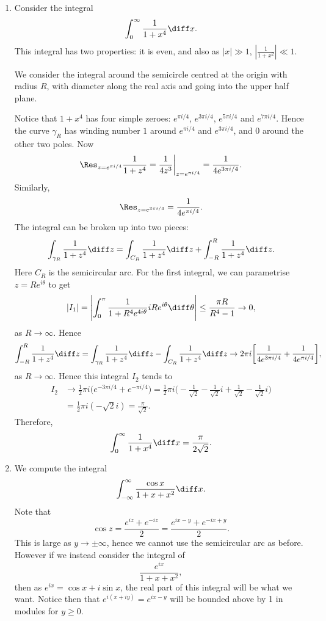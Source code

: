 \documentclass[12pt]{article}
\begin{document}
\begin{exbox}
	\begin{enumerate}
		\item Consider the integral
			\[
			\int_0^\infty \frac{1}{1+x^{4}}\diff x.
			\]
			This integral has two properties: it is even, and also as $|x| \gg 1$, $| \frac{1}{1 + x^2}| \ll 1$.

			We consider the integral around the semicircle centred at the origin with radius $R$, with diameter along the real axis and going into the upper half plane.%

			Notice that $1 + x^{4}$ has four simple zeroes: $e^{\pi i/4}$, $e^{3 \pi i/4}$, $e^{5 \pi i/4}$ and $e^{7 \pi i/4}$. Hence the curve $\gamma_R$ has winding number $1$ around $e^{\pi i/4}$ and $e^{3 \pi i/4}$, and $0$ around the other two poles. Now
			\[
				\Res_{z = e^{\pi i/4}} \frac{1}{1 + z^{4}} = \frac{1}{4 z^3} \biggr|_{z = e^{\pi i/4}} = \frac{1}{4 e^{3 \pi i/4}}.
			\]
			Similarly,
			\[
				\Res_{z = e^{3 \pi i/4}} = \frac{1}{4 e^{\pi i/4}}.
			\]
			The integral can be broken up into two pieces:
			\[
				\int_{\gamma_R} \frac{1}{1 + z^{4}}\diff z = \int_{C_R} \frac{1}{1 + z^{4}}\diff z + \int_{-R}^{R} \frac{1}{1 + z^{4}}\diff z.
			\]
			Here $C_R$ is the semicircular arc. For the first integral, we can parametrise $z = Re^{i \theta}$ to get
			\[
			|I_1| = \Biggl| \int_0^\pi \frac{1}{1 + R^{4} e^{4 i \theta}} i R e^{i \theta} \diff \theta \Biggr| \le \frac{\pi R}{R^{4} - 1} \to 0,
			\]
			as $R \to \infty$. Hence
			\[
				\int_{-R}^{R} \frac{1}{1 + z^{4}} \diff z = \int_{\gamma_R} \frac{1}{1 + z^{4}}\diff z - \int_{C_R} \frac{1}{1 + z^{4}} \diff z \to 2 \pi i \biggl[ \frac{1}{4 e^{3 \pi i/4}} + \frac{1}{4 e^{\pi i/4}}\biggr],
			\]
			as $R \to \infty$. Hence this integral $I_2$ tends to
			\begin{align*}
				I_2 &\to \frac{1}{2} \pi i \bigl(e^{-3 \pi i/4} + e^{-\pi i/4}\bigr) = \frac{1}{2} \pi i \biggl( - \frac{1}{\sqrt 2} - \frac{1}{\sqrt 2} i + \frac{1}{\sqrt 2} - \frac{1}{\sqrt 2} i \biggr) \\
				    &= \frac{1}{2} \pi i (-\sqrt 2 i) = \frac{\pi}{\sqrt 2}.
			\end{align*}
			Therefore,
			\[
			\int_0^\infty \frac{1}{1 + x^{4}}\diff x = \frac{\pi}{2 \sqrt 2}.
			\]
		\item We compute the integral
			\[
				\int_{-\infty}^{\infty} \frac{\cos x}{1 + x + x^2}\diff x.
			\]
			Note that
			\[
			\cos z = \frac{e^{iz} + e^{-iz}}{2} = \frac{e^{ix - y} + e^{-ix + y}}{2}.
			\]
			This is large as $y \to \pm \infty$, hence we cannot use the semicircular arc as before. However if we instead consider the integral of
			\[
			\frac{e^{ix}}{1 + x + x^2},
			\]
			then as $e^{ix} = \cos x + i \sin x$, the real part of this integral will be what we want. Notice then that $e^{i(x+iy)} = e^{ix - y}$ will be bounded above by 1 in modules for $y \ge 0$.


\end{enumerate}
\end{exbox}
\end{document}
